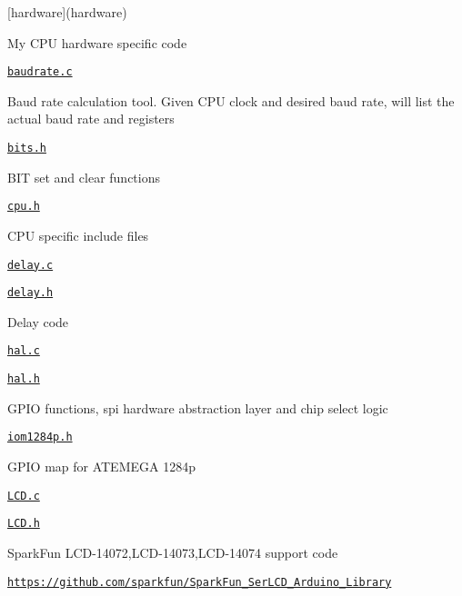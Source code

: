 \begin{DoxyItemize}
\item \mbox{[}hardware\mbox{]}(hardware)
\begin{DoxyItemize}
\item My C\+PU hardware specific code
\item \href{hardware/baudrate.c}{\tt baudrate.\+c}
\begin{DoxyItemize}
\item Baud rate calculation tool. Given C\+PU clock and desired baud rate, will list the actual baud rate and registers
\end{DoxyItemize}
\item \href{hardware/bits.h}{\tt bits.\+h}
\begin{DoxyItemize}
\item B\+IT set and clear functions
\end{DoxyItemize}
\item \href{hardware/cpu.h}{\tt cpu.\+h}
\begin{DoxyItemize}
\item C\+PU specific include files
\end{DoxyItemize}
\item \href{hardware/delay.c}{\tt delay.\+c}
\item \href{hardware/delay.h}{\tt delay.\+h}
\begin{DoxyItemize}
\item Delay code
\end{DoxyItemize}
\item \href{hardware/hal.c}{\tt hal.\+c}
\item \href{hardware/hal.h}{\tt hal.\+h}
\begin{DoxyItemize}
\item G\+P\+IO functions, spi hardware abstraction layer and chip select logic
\end{DoxyItemize}
\item \href{hardware/iom1284p.h}{\tt iom1284p.\+h}
\begin{DoxyItemize}
\item G\+P\+IO map for A\+T\+E\+M\+E\+GA 1284p
\end{DoxyItemize}
\item \href{hardware/LCD.c}{\tt L\+C\+D.\+c}
\item \href{hardware/LCD.h}{\tt L\+C\+D.\+h}
\begin{DoxyItemize}
\item Spark\+Fun L\+C\+D-\/14072,L\+C\+D-\/14073,L\+C\+D-\/14074 support code
\item \href{https://github.com/sparkfun/SparkFun_SerLCD_Arduino_Library}{\tt https\+://github.\+com/sparkfun/\+Spark\+Fun\+\_\+\+Ser\+L\+C\+D\+\_\+\+Arduino\+\_\+\+Library}

\end{DoxyItemize}
\end{DoxyItemize}
\end{DoxyItemize}
